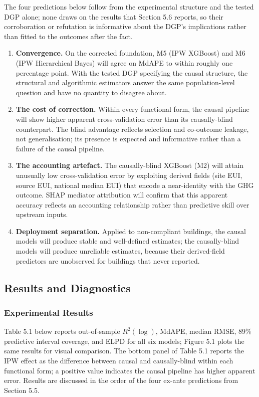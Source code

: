 The four predictions below follow from the experimental structure and the tested DGP alone; none draws on the results that Section 5.6 reports, so their corroboration or refutation is informative about the DGP's implications rather than fitted to the outcomes after the fact.

\begin{enumerate}
  \item \textbf{Convergence.} On the corrected foundation, M5 (IPW XGBoost) and M6 (IPW Hierarchical Bayes) will agree on MdAPE to within roughly one percentage point. With the tested DGP specifying the causal structure, the structural and algorithmic estimators answer the same population-level question and have no quantity to disagree about.
  \item \textbf{The cost of correction.} Within every functional form, the causal pipeline will show higher apparent cross-validation error than its causally-blind counterpart. The blind advantage reflects selection and co-outcome leakage, not generalisation; its presence is expected and informative rather than a failure of the causal pipeline.
  \item \textbf{The accounting artefact.} The causally-blind XGBoost (M2) will attain unusually low cross-validation error by exploiting derived fields (site EUI, source EUI, national median EUI) that encode a near-identity with the GHG outcome. SHAP mediator attribution will confirm that this apparent accuracy reflects an accounting relationship rather than predictive skill over upstream inputs.
  \item \textbf{Deployment separation.} Applied to non-compliant buildings, the causal models will produce stable and well-defined estimates; the causally-blind models will produce unreliable estimates, because their derived-field predictors are unobserved for buildings that never reported.
\end{enumerate}

\subsection{Results and Diagnostics}

\subsubsection*{Experimental Results}

Table 5.1 below reports out-of-sample $R^2(\log)$, MdAPE, median RMSE, 89\% predictive interval coverage, and ELPD for all six models; Figure 5.1 plots the same results for visual comparison. The bottom panel of Table 5.1 reports the IPW effect as the difference between causal and causally-blind within each functional form; a positive value indicates the causal pipeline has higher apparent error. Results are discussed in the order of the four ex-ante predictions from Section 5.5.

